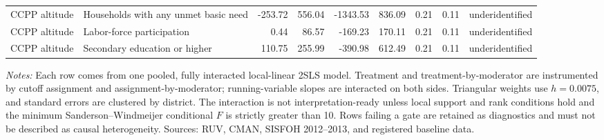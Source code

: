 \begin{table}[!htbp]
{\begin{tabular}{llrrrrrrl}
CCPP altitude & Households with any unmet basic need & -253.72 & 556.04 & -1343.53 & 836.09 & 0.21 & 0.11 & underidentified \\
CCPP altitude & Labor-force participation & 0.44 & 86.57 & -169.23 & 170.11 & 0.21 & 0.11 & underidentified \\
CCPP altitude & Secondary education or higher & 110.75 & 255.99 & -390.98 & 612.49 & 0.21 & 0.11 & underidentified \\
\bottomrule
\end{tabular}}
\parbox{0.97\linewidth}{\footnotesize \textit{Notes:} Each row comes from one pooled, fully interacted local-linear 2SLS model. Treatment and treatment-by-moderator are instrumented by cutoff assignment and assignment-by-moderator; running-variable slopes are interacted on both sides. Triangular weights use \(h=0.0075\), and standard errors are clustered by district. The interaction is not interpretation-ready unless local support and rank conditions hold and the minimum Sanderson--Windmeijer conditional \(F\) is strictly greater than 10. Rows failing a gate are retained as diagnostics and must not be described as causal heterogeneity. Sources: RUV, CMAN, SISFOH 2012--2013, and registered baseline data.}
\end{table}
